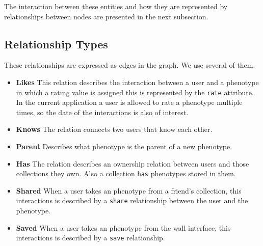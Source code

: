 \documentclass[conference]{IEEEtran}
\begin{document}
The interaction between these entities and how they are represented by relationships 
between nodes are presented in the next subsection. 

\subsection{Relationship Types}

These relationships are expressed as edges in the graph. We use
several of them.

\begin{itemize}
\item {\bf Likes} This relation describes the interaction between a user and
a phenotype in which a rating value is assigned this is represented by 
the {\tt rate} attribute. In the current application a user is allowed to rate
a phenotype multiple times, so the date of the interactions is also of
interest.

\item {\bf Knows} The relation connects two users that know each
other. 

\item {\bf Parent} Describes what phenotype is the parent of a new
  phenotype. 

\item {\bf Has} The relation describes an ownership relation between users and
those collections they own. Also a collection {\tt has}  phenotypes stored
in them.

\item {\bf Shared} When a user takes an phenotype from a friend's collection, this interactions 
is described by a {\tt share} relationship between the user and the
phenotype.  %

\item {\bf Saved} When a user takes an phenotype from the wall interface, this 
interactions is described by a {\tt save} relationship. 
\end{itemize}

  
\end{document}
